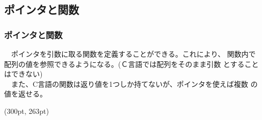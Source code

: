 \documentclass[dvipdfmx]{beamer}
\begin{document}
\subsection{ポインタと関数}
\begin{frame}[c, fragile, label=72]
    \frametitle{ポインタと関数}
    　ポインタを引数に取る関数を定義することができる。これにより、
    関数内で配列の値を参照できるようになる。(Ｃ言語では配列をそのまま引数
    とすることはできない)\\
    　また、C言語の関数は返り値を1つしか持てないが、ポインタを使えば複数
    の値を返せる。
    \begin{textblock*}{0.3\linewidth}(300pt, 263pt)
        \hyperlink{71}{}
        \space
        \hyperlink{73}{}
    \end{textblock*}
\end{frame}
\end{document}
